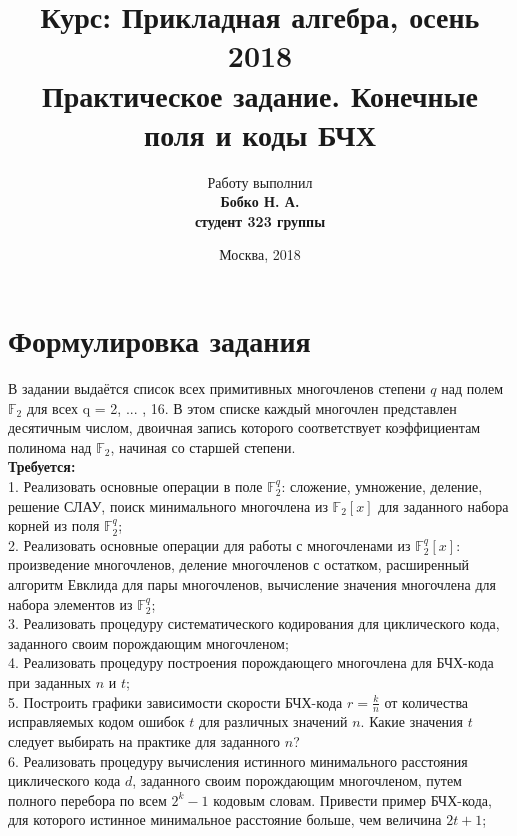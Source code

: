 \documentclass[12pt]{article}
\title{\textbf{Курс: Прикладная алгебра, осень 2018 \\
Практическое задание. Конечные поля и коды БЧХ \\}}
\author{Работу выполнил\\
\textbf{Бобко Н. А.} \\
\textbf{студент 323 группы}}
\date{Москва, 2018}
\newcommand{\F}{\mathbb{F}_2}
\newcommand{\Fq}{\mathbb{F}_2^q}
\begin{document}
    \maketitle
    \newpage

    \tableofcontents
    \newpage

    \section{Формулировка задания}
        В задании выдаётся список всех примитивных многочленов степени $q$ над полем $\F$ для всех q = 2, ... , 16.
        В этом списке каждый многочлен представлен десятичным числом, двоичная запись которого соответствует
        коэффициентам полинома над $\F$, начиная со старшей степени.\\

        \textbf{Требуется:}\\
        1. Реализовать основные операции в поле $\Fq$: сложение, умножение, деление, решение СЛАУ, поиск 
        минимального многочлена из $\F[x]$ для заданного набора корней из поля $\Fq$; \\

        2. Реализовать основные операции для работы с многочленами из $\Fq[x]$: произведение многочленов, 
        деление многочленов с остатком, расширенный алгоритм Евклида для пары многочленов, вычисление 
        значения многочлена для набора элементов из $\Fq$; \\

        3. Реализовать процедуру систематического кодирования для циклического кода, заданного своим 
        порождающим многочленом; \\

        4. Реализовать процедуру построения порождающего многочлена для БЧХ-кода при заданных $n$ и 
        $t$; \\

        5. Построить графики зависимости скорости БЧХ-кода $r=\frac{k}{n}$ от количества исправляемых 
        кодом ошибок $t$ для различных значений $n$. Какие значения $t$ следует выбирать на практике
        для заданного $n$? \\

        6. Реализовать процедуру вычисления истинного минимального расстояния циклического кода $d$, заданного
        своим порождающим многочленом, путем полного перебора по всем $2^k - 1$ кодовым словам. Привести
        пример БЧХ-кода, для которого истинное минимальное расстояние больше, чем величина $2t + 1$; \\
\end{document}

